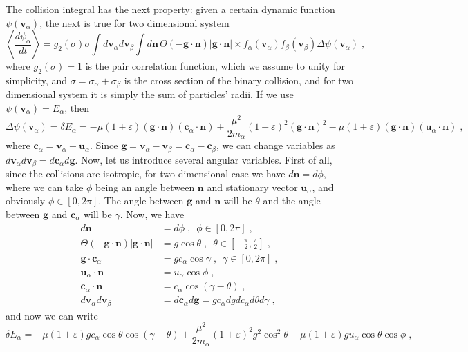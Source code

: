 \documentclass[preprint, aps, pra]{revtex4-1}
\newcommand{\eps}{\varepsilon}
\newcommand{\bv}{{\bm{v}}}
\newcommand{\bu}{{\bm{u}}}
\newcommand{\bc}{{\bm{c}}}
\newcommand{\bg}{{\bm{g}}}
\newcommand{\bn}{{\bm{n}}}
\begin{document}
The collision integral has the next property: given a certain dynamic function $\psi(\bv_\alpha)$, the next is true for two dimensional system
\begin{equation}  
  \left\langle\frac{d\psi_\alpha}{dt}\right\rangle=g_2(\sigma)\sigma\int d\bv_\alpha d\bv_\beta\int d\bn\,\Theta(-\bg\cdot\bn)\vert\bg\cdot\bn\vert
  \times f_\alpha(\bv_\alpha)f_\beta(\bv_\beta)\Delta\psi(\bv_\alpha)\;,
\end{equation}
where $g_2(\sigma)=1$ is the pair correlation function, which we assume to unity for simplicity, and $\sigma=\sigma_\alpha+\sigma_\beta$ is 
the cross section of the binary collision, and for two dimensional system it is simply the sum of particles' radii. If we use 
$\psi(\bv_\alpha)=E_\alpha$, then
\begin{equation}
  \Delta\psi(\bv_\alpha)=\delta E_\alpha=-\mu(1+\eps)(\bg\cdot\bn)(\bc_\alpha\cdot\bn)+\frac{\mu^2}{2m_\alpha}(1+\eps)^2(\bg\cdot\bn)^2
  -\mu(1+\eps)(\bg\cdot\bn)(\bu_\alpha\cdot\bn)\;,
\end{equation}
where $\bc_\alpha=\bv_\alpha-\bu_\alpha$. Since $\bg=\bv_\alpha-\bv_\beta=\bc_\alpha-\bc_\beta$, we can change variables as 
$d\bv_\alpha d\bv_\beta=d\bc_\alpha d\bg$. Now, let us introduce several angular variables. First of all, since the collisions are 
isotropic, for two dimensional case we have $d\bn=d\phi$, where we can take $\phi$ being an angle between $\bn$ and stationary vector 
$\bu_\alpha$, and obviously $\phi\in[0, 2\pi]$. The angle between $\bg$ and $\bn$ will be $\theta$ and the angle between $\bg$ and $\bc_\alpha$
will be $\gamma$. Now, we have
\begin{equation}
  \begin{split}
    d\bn &= d\phi\;,\,\,\,\phi\in[0, 2\pi]\;,\\
    \Theta(-\bg\cdot\bn)\vert\bg\cdot\bn\vert &= g\cos\theta\;,\,\,\,\theta\in\left[-\frac{\pi}{2},\frac{\pi}{2}\right]\;,\\
    \bg\cdot\bc_\alpha&= gc_\alpha\cos\gamma\;,\,\,\,\gamma\in[0, 2\pi]\;,\\
    \bu_\alpha\cdot\bn &= u_\alpha\cos\phi\;,\\
    \bc_\alpha\cdot\bn &= c_\alpha\cos(\gamma-\theta)\;,\\
    d\bv_\alpha d\bv_\beta&=d\bc_\alpha d\bg = gc_\alpha dg dc_\alpha d\theta d\gamma\;,
  \end{split}
\end{equation}
and now we can write
\begin{equation}
  \delta E_\alpha=-\mu(1+\eps)gc_\alpha\cos\theta\cos(\gamma-\theta)+\frac{\mu^2}{2m_\alpha}(1+\eps)^2g^2\cos^2\theta
  -\mu(1+\eps)gu_\alpha\cos\theta\cos\phi\;,
\end{equation}
\end{document}

